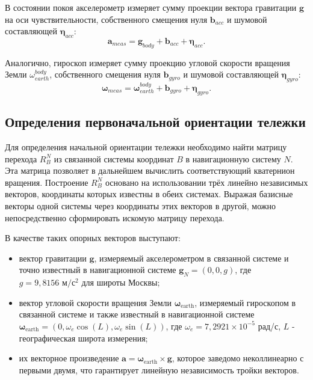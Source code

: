 В состоянии покоя акселерометр измеряет сумму проекции вектора гравитации \(\bm{g}\) на оси чувствительности, собственного смещения нуля $\bm{b}_{acc}$ и шумовой составляющей $\bm{\eta}_{acc}$:
\begin{equation}
	\bm{a}_{meas} = \bm{g}_{body} + \bm{b}_{acc} + \boldsymbol{\eta}_{acc} \text{.}
\end{equation}

Аналогично, гироскоп измеряет сумму проекцию угловой скорости вращения Земли $\omega_{earth}^{body}$, собственного смещения нуля $\bm{b}_{gyro}$ и шумовой составляющей $\bm{\eta}_{gyro}$:
\begin{equation}
	\bm{\omega}_{meas} = \bm{\omega}_{earth}^{body} + \bm{b}_{gyro} + \bm{\eta}_{gyro} \text{.}
\end{equation}



\subsection{Определения первоначальной ориентации тележки}

Для определения начальной ориентации тележки необходимо найти матрицу перехода $R_{B}^{N}$ из связанной системы координат $B$ в навигационную систему $N$. Эта матрица позволяет в дальнейшем вычислить соответствующий кватернион вращения. Построение $R_{B}^{N}$ основано на использовании трёх линейно независимых векторов, координаты которых известны в обеих системах. Выражая базисные векторы одной системы через координаты этих векторов в другой, можно непосредственно сформировать искомую матрицу перехода.

В качестве таких опорных векторов выступают:
\begin{itemize}
	\item вектор гравитации $\bm{g}$, измеряемый акселерометром в связанной системе и точно известный в навигационной системе $\bm{g}_{N}=(0,0,g)$, где $g = 9{,}8156 \text{ м}/\text{с}^2$ для широты Москвы;
	\item вектор угловой скорости вращения Земли $\bm{\omega}_{\text{earth}}$, измеряемый гироскопом в связанной системе и также известный в навигационной системе $\bm{\omega}_{\text{earth}} = (0, \omega_{e} \cos(L), \omega_{e} \sin(L))$, где $\omega_{e} = 7{,}2921 \times 10^{-5}$ рад/с, $L$ - географическая широта измерения;
	\item их векторное произведение $\bm{a} = \bm{\omega}_{\text{earth}} \times \bm{g}$, которое заведомо неколлинеарно с первыми двумя, что гарантирует линейную независимость тройки векторов.
\end{itemize}


